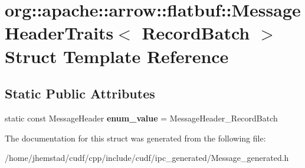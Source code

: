 \hypertarget{structorg_1_1apache_1_1arrow_1_1flatbuf_1_1MessageHeaderTraits_3_01RecordBatch_01_4}{}\section{org\+:\+:apache\+:\+:arrow\+:\+:flatbuf\+:\+:Message\+Header\+Traits$<$ Record\+Batch $>$ Struct Template Reference}
\label{structorg_1_1apache_1_1arrow_1_1flatbuf_1_1MessageHeaderTraits_3_01RecordBatch_01_4}
\subsection*{Static Public Attributes}
\begin{DoxyCompactItemize}
\item 
static const Message\+Header {\bfseries enum\+\_\+value} = Message\+Header\+\_\+\+Record\+Batch\hypertarget{structorg_1_1apache_1_1arrow_1_1flatbuf_1_1MessageHeaderTraits_3_01RecordBatch_01_4_ade2573d9e54ce4b85789d1c6a82968e1}{}\label{structorg_1_1apache_1_1arrow_1_1flatbuf_1_1MessageHeaderTraits_3_01RecordBatch_01_4_ade2573d9e54ce4b85789d1c6a82968e1}

\end{DoxyCompactItemize}


The documentation for this struct was generated from the following file\+:\begin{DoxyCompactItemize}
\item 
/home/jhemstad/cudf/cpp/include/cudf/ipc\+\_\+generated/Message\+\_\+generated.\+h\end{DoxyCompactItemize}

